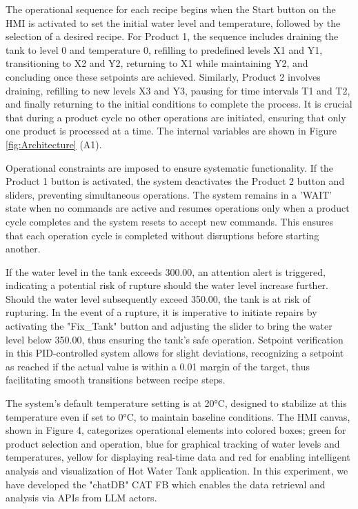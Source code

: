 \begin{bibunit}
The operational sequence for each recipe begins when the Start button on the HMI is activated to set the initial water level and temperature, followed by the selection of a desired recipe. For Product 1, the sequence includes draining the tank to level 0 and temperature 0, refilling to predefined levels X1 and Y1, transitioning to X2 and Y2, returning to X1 while maintaining Y2, and concluding once these setpoints are achieved. Similarly, Product 2 involves draining, refilling to new levels X3 and Y3, pausing for time intervals T1 and T2, and finally returning to the initial conditions to complete the process. It is crucial that during a product cycle no other operations are initiated, ensuring that only one product is processed at a time. The internal variables are shown in Figure \ref{fig:Architecture} (A1).

Operational constraints are imposed to ensure systematic functionality. If the Product 1 button is activated, the system deactivates the Product 2 button and sliders, preventing simultaneous operations. The system remains in a 'WAIT' state when no commands are active and resumes operations only when a product cycle completes and the system resets to accept new commands. This ensures that each operation cycle is completed without disruptions before starting another.

If the water level in the tank exceeds 300.00, an attention alert is triggered, indicating a potential risk of rupture should the water level increase further. Should the water level subsequently exceed 350.00, the tank is at risk of rupturing. In the event of a rupture, it is imperative to initiate repairs by activating the "Fix\_Tank" button and adjusting the slider to bring the water level below 350.00, thus ensuring the tank's safe operation. Setpoint verification in this PID-controlled system allows for slight deviations, recognizing a setpoint as reached if the actual value is within a 0.01 margin of the target, thus facilitating smooth transitions between recipe steps. 

The system's default temperature setting is at 20°C, designed to stabilize at this temperature even if set to 0°C, to maintain baseline conditions. The HMI canvas, shown in Figure 4, categorizes operational elements into colored boxes; green for product selection and operation, blue for graphical tracking of water levels and temperatures,  yellow for displaying real-time data and red for enabling intelligent analysis and visualization of Hot Water Tank application. In this experiment, we have developed the "chatDB" CAT FB which enables the data retrieval and analysis via APIs from LLM actors.


\end{bibunit}
